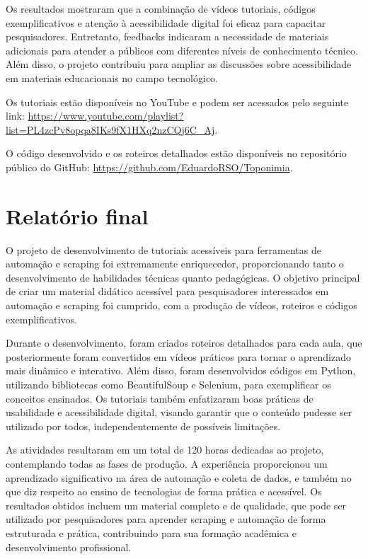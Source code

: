 \documentclass{article}
\begin{document}
Os resultados mostraram que a combinação de vídeos tutoriais, códigos exemplificativos e atenção à acessibilidade digital foi eficaz para capacitar pesquisadores. Entretanto, feedbacks indicaram a necessidade de materiais adicionais para atender a públicos com diferentes níveis de conhecimento técnico. Além disso, o projeto contribuiu para ampliar as discussões sobre acessibilidade em materiais educacionais no campo tecnológico.

Os tutoriais estão disponíveis no YouTube e podem ser acessados pelo seguinte link: \url{https://www.youtube.com/playlist?list=PL4zcPv8opqa8IKs9fX1HXq2nzCQj6C_Aj}. 

O código desenvolvido e os roteiros detalhados estão disponíveis no repositório público do GitHub: \url{https://github.com/EduardoRSO/Toponimia}.

\section*{Relatório final}
O projeto de desenvolvimento de tutoriais acessíveis para ferramentas de automação e scraping foi extremamente enriquecedor, proporcionando tanto o desenvolvimento de habilidades técnicas quanto pedagógicas. O objetivo principal de criar um material didático acessível para pesquisadores interessados em automação e scraping foi cumprido, com a produção de vídeos, roteiros e códigos exemplificativos.

Durante o desenvolvimento, foram criados roteiros detalhados para cada aula, que posteriormente foram convertidos em vídeos práticos para tornar o aprendizado mais dinâmico e interativo. Além disso, foram desenvolvidos códigos em Python, utilizando bibliotecas como BeautifulSoup e Selenium, para exemplificar os conceitos ensinados. Os tutoriais também enfatizaram boas práticas de usabilidade e acessibilidade digital, visando garantir que o conteúdo pudesse ser utilizado por todos, independentemente de possíveis limitações.

As atividades resultaram em um total de 120 horas dedicadas ao projeto, contemplando todas as fases de produção. A experiência proporcionou um aprendizado significativo na área de automação e coleta de dados, e também no que diz respeito ao ensino de tecnologias de forma prática e acessível. Os resultados obtidos incluem um material completo e de qualidade, que pode ser utilizado por pesquisadores para aprender scraping e automação de forma estruturada e prática, contribuindo para sua formação acadêmica e desenvolvimento profissional.
\end{document}
